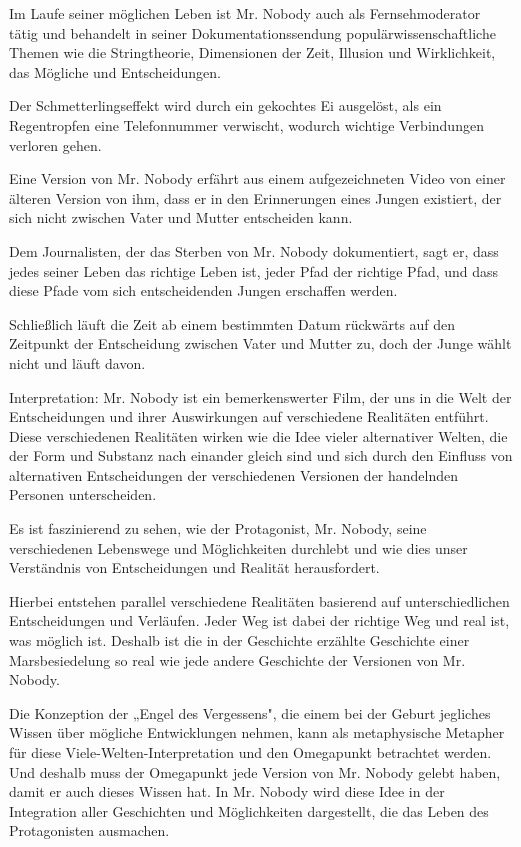 \documentclass[
  ngerman,
]{article}
\begin{document}
Im Laufe seiner möglichen Leben ist Mr. Nobody auch als Fernsehmoderator
tätig und behandelt in seiner Dokumentationssendung
populärwissenschaftliche Themen wie die Stringtheorie, Dimensionen der
Zeit, Illusion und Wirklichkeit, das Mögliche und Entscheidungen.

Der Schmetterlingseffekt wird durch ein gekochtes Ei ausgelöst, als ein
Regentropfen eine Telefonnummer verwischt, wodurch wichtige Verbindungen
verloren gehen.

Eine Version von Mr. Nobody erfährt aus einem aufgezeichneten Video von
einer älteren Version von ihm, dass er in den Erinnerungen eines Jungen
existiert, der sich nicht zwischen Vater und Mutter entscheiden kann.

Dem Journalisten, der das Sterben von Mr. Nobody dokumentiert, sagt er,
dass jedes seiner Leben das richtige Leben ist, jeder Pfad der richtige
Pfad, und dass diese Pfade vom sich entscheidenden Jungen erschaffen
werden.

Schließlich läuft die Zeit ab einem bestimmten Datum rückwärts auf den
Zeitpunkt der Entscheidung zwischen Vater und Mutter zu, doch der Junge
wählt nicht und läuft davon.

Interpretation: Mr. Nobody ist ein bemerkenswerter Film, der uns in die
Welt der Entscheidungen und ihrer Auswirkungen auf verschiedene
Realitäten entführt. Diese verschiedenen Realitäten wirken wie die Idee
vieler alternativer Welten, die der Form und Substanz nach einander
gleich sind und sich durch den Einfluss von alternativen Entscheidungen
der verschiedenen Versionen der handelnden Personen unterscheiden.

Es ist faszinierend zu sehen, wie der Protagonist, Mr. Nobody, seine
verschiedenen Lebenswege und Möglichkeiten durchlebt und wie dies unser
Verständnis von Entscheidungen und Realität herausfordert.

Hierbei entstehen parallel verschiedene Realitäten basierend auf
unterschiedlichen Entscheidungen und Verläufen. Jeder Weg ist dabei der
richtige Weg und real ist, was möglich ist. Deshalb ist die in der
Geschichte erzählte Geschichte einer Marsbesiedelung so real wie jede
andere Geschichte der Versionen von Mr. Nobody.

Die Konzeption der „Engel des Vergessens", die einem bei der Geburt
jegliches Wissen über mögliche Entwicklungen nehmen, kann als
metaphysische Metapher für diese Viele-Welten-Interpretation und den
Omegapunkt betrachtet werden. Und deshalb muss der Omegapunkt jede
Version von Mr. Nobody gelebt haben, damit er auch dieses Wissen hat. In
Mr. Nobody wird diese Idee in der Integration aller Geschichten und
Möglichkeiten dargestellt, die das Leben des Protagonisten ausmachen.
\end{document}
